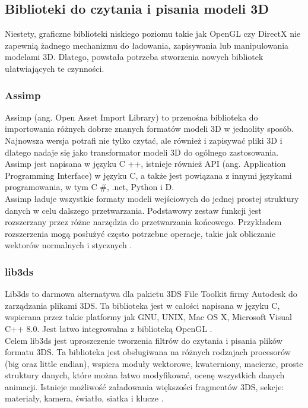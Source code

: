 \newpage
\subsection{Biblioteki do czytania i pisania modeli 3D}
Niestety, graficzne biblioteki niskiego poziomu takie jak OpenGL czy DirectX nie zapewnią żadnego mechanizmu do ładowania, zapisywania lub manipulowania modelami 3D. Dlatego, powstała potrzeba stworzenia nowych bibliotek ułatwiających te czynności. 
\subsubsection{Assimp}
Assimp (ang. Open Asset Import Library) to przenośna biblioteka do importowania różnych dobrze znanych formatów modeli 3D w jednolity sposób. Najnowsza wersja potrafi nie tylko czytać, ale również i zapisywać pliki 3D i dlatego nadaje się jako transformator modeli 3D do ogólnego zastosowania. Assimp jest napisana w języku C ++, istnieje również API (ang. Application Programming Interface) w języku C, a także jest powiązana z innymi językami programowania, w tym C \#, .net, Python i D.\\
Assimp ładuje wszystkie formaty modeli wejściowych do jednej prostej struktury danych w celu dalszego przetwarzania. Podstawowy zestaw funkcji jest rozszerzany przez różne narzędzia do przetwarzania końcowego. Przykładem rozszerzenia mogą posłużyć często potrzebne operacje, takie jak obliczanie wektorów normalnych i stycznych \cite{assimp}.
\subsubsection{lib3ds}
Lib3ds to darmowa alternatywa dla pakietu 3DS File Toolkit firmy Autodesk do zarządzania plikami 3DS. Ta biblioteka jest w całości napisana w języku C, wspierana przez takie platformy jak GNU, UNIX, Mac OS X, Microsoft Visual C++ 8.0. Jest łatwo integrowalna z biblioteką OpenGL \cite{lib3dsofficial}. \\
Celem lib3ds jest uproszczenie tworzenia filtrów do czytania i pisania plików formatu 3DS. Ta biblioteka jest obsługiwana na różnych rodzajach procesorów (big oraz little endian), wspiera moduły wektorowe, kwaterniony, macierze, proste struktury danych, które można łatwo modyfikować, ocenę wszystkich danych animacji. Istnieje możliwość załadowania większości fragmentów 3DS, sekcje: materiały, kamera, światło, siatka i klucze \cite{lib3dsdirectory}.

\newpage
